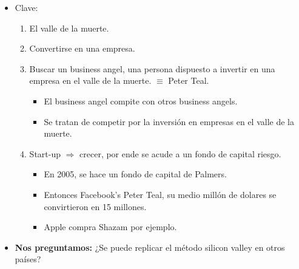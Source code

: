 \begin{enumerate}
\begin{itemize}
            \item Clave: 
                \begin{enumerate}
                    \item El valle de la muerte.
                    \item Convertirse en una empresa.
                    \item Buscar un business angel, una persona dispuesto a invertir en una empresa en el valle de la muerte. $\equiv$ Peter Teal.
                        \begin{itemize}
                            \item El business angel compite con otros business angels.
                            \item Se tratan de competir por la inversión en empresas en el valle de la muerte.
                        \end{itemize} 
                    \item Start-up $\Rightarrow$ crecer, por ende se acude a un fondo de capital riesgo.
                        \begin{itemize}
                            \item En 2005, se hace un fondo de capital de Palmers. 
                            \item Entonces Facebook's Peter Teal, su medio millón de dolares se convirtieron en 15 millones.
                            \item Apple compra Shazam por ejemplo. 
                        \end{itemize}
                \end{enumerate}
            
            \item \textbf{Nos preguntamos:} ¿Se puede replicar el método silicon valley en otros países?
        \end{itemize}
\end{enumerate}
